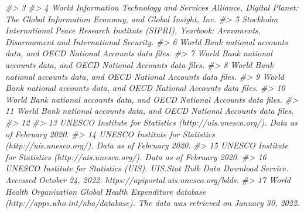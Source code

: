 \documentclass[
  xelatex, ja=standard]{bxjsbook}
\newenvironment{Shaded}{\begin{snugshade}}{\end{snugshade}}
\newcommand{\CommentTok}[1]{\textcolor[rgb]{0.56,0.35,0.01}{\textit{#1}}}
\theoremstyle{definition}
\theoremstyle{definition}
\theoremstyle{definition}
\theoremstyle{definition}
\theoremstyle{remark}
\begin{document}
\begin{Shaded}
\begin{Highlighting}[]
\CommentTok{\#\textgreater{} 3                                                                                                                                               }
\CommentTok{\#\textgreater{} 4                   World Information Technology and Services Alliance, Digital Planet: The Global Information Economy, and Global Insight, Inc.}
\CommentTok{\#\textgreater{} 5                         Stockholm International Peace Research Institute (SIPRI), Yearbook: Armaments, Disarmament and International Security.}
\CommentTok{\#\textgreater{} 6                                                                      World Bank national accounts data, and OECD National Accounts data files.}
\CommentTok{\#\textgreater{} 7                                                                      World Bank national accounts data, and OECD National Accounts data files.}
\CommentTok{\#\textgreater{} 8                                                                      World Bank national accounts data, and OECD National Accounts data files.}
\CommentTok{\#\textgreater{} 9                                                                      World Bank national accounts data, and OECD National Accounts data files.}
\CommentTok{\#\textgreater{} 10                                                                     World Bank national accounts data, and OECD National Accounts data files.}
\CommentTok{\#\textgreater{} 11                                                                     World Bank national accounts data, and OECD National Accounts data files.}
\CommentTok{\#\textgreater{} 12                                                                                                                                              }
\CommentTok{\#\textgreater{} 13                                                           UNESCO Institute for Statistics (http://uis.unesco.org/). Data as of February 2020.}
\CommentTok{\#\textgreater{} 14                                                           UNESCO Institute for Statistics (http://uis.unesco.org/). Data as of February 2020.}
\CommentTok{\#\textgreater{} 15                                                           UNESCO Institute for Statistics (http://uis.unesco.org/). Data as of February 2020.}
\CommentTok{\#\textgreater{} 16 UNESCO Institute for Statistics (UIS). UIS.Stat Bulk Data Download Service. Accessed October 24, 2022. https://apiportal.uis.unesco.org/bdds.}
\CommentTok{\#\textgreater{} 17  World Health Organization Global Health Expenditure database (http://apps.who.int/nha/database). The data was retrieved on January 30, 2022.}

\end{Highlighting}
\end{Shaded}
\end{document}
